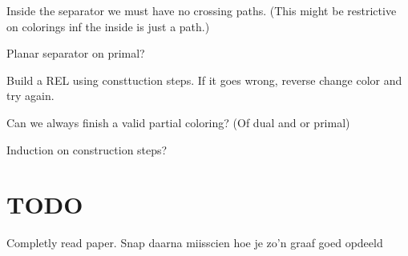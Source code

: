 Inside the separator we must have no crossing paths. (This might be restrictive on colorings inf the inside is just a path.)

Planar separator on primal?


Build a REL using consttuction steps. If it goes wrong, reverse change color and try again.

Can we always finish a valid partial coloring? (Of dual and or primal)


Induction on construction steps?

\section{TODO}
Completly read paper. Snap daarna miisscien hoe je zo'n graaf goed opdeeld


\printbibliography

